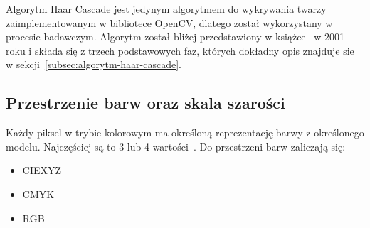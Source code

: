 \documentclass[a4paper,twoside,12pt]{book}
\begin{document}
    Algorytm Haar Cascade jest jedynym algorytmem do wykrywania twarzy zaimplementowanym w bibliotece OpenCV,
    dlatego został wykorzystany w procesie badawczym.
    Algorytm został bliżej przedstawiony w książce~\cite{violaJones} w 2001 roku i składa się z trzech podstawowych faz,
    których dokładny opis znajduje sie w sekcji~\ref{subsec:algorytm-haar-cascade}.


    \subsection{Przestrzenie barw oraz skala szarości}\label{subsec:konwersja-do-skali-szarości-oraz-przestrzenie-barw}
    Każdy piksel w trybie kolorowym ma określoną reprezentację barwy z określonego modelu.
    Najczęściej są to 3 lub 4 wartości~\cite{przestrzenieKolorow}.
    Do przestrzeni barw zaliczają się:
    \begin{itemize}
        \item CIEXYZ
        \item CMYK
        \item RGB
    \end{itemize}
\end{document}
